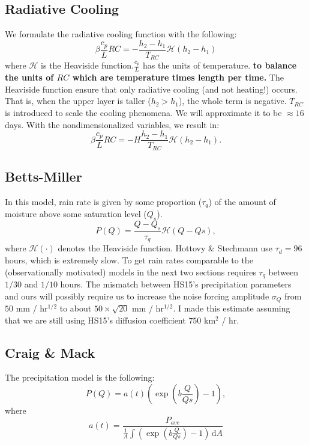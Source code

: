 \documentclass[10pt]{article}
\newcommand{\rmd}{\,\mathrm{d}}
\newcommand{\HH}{\mathcal{H}}
\begin{document}
\subsection{Radiative Cooling}

We formulate the radiative cooling function with the following:
\begin{equation}
\beta \frac{c_p}{L} RC = -\frac{h_2-h_1}{T_{RC}}\HH(h_2-h_1)
\end{equation}
where $\HH$ is the Heaviside function.{\color{blue}$\frac{c_p}{L}$ has the units of temperature.} {\bf to balance the units of $RC$ which are temperature times length per time.} The Heaviside function ensure that only radiative cooling (and not heating!) occurs. 
That is, when the upper layer  is taller ($h_2 > h_1$), the whole term is negative. 
$T_{RC}$ is introduced to scale the cooling phenomena. 
We will approximate it to be $\approx 16$ days. 
{\color{blue} With the nondimensionalized variables, we result in:
	\begin{equation}
	\beta \frac{c_p}{L} RC = -H\frac{h_2-h_1}{T_{RC}}\HH(h_2-h_1).
	\end{equation}
}

\subsection{Betts-Miller}
In this model, rain rate is given by some proportion ($\tau_q$) of the amount of moisture above some saturation level ($Q_s$).
\begin{equation*}
P(Q) = \frac{Q-Q_s}{\tau_q}\HH{(Q-Qs)},
\end{equation*}
where $\HH(\cdot)$ denotes the Heaviside function. 
Hottovy \& Stechmann use $\tau_d=96$ hours, which is extremely slow.
To get rain rates comparable to the (observationally motivated) models in the next two sections requires $\tau_q$ between $1/30$ and $1/10$ hours.
The mismatch between HS15's precipitation parameters and ours will possibly require us to increase the noise forcing amplitude $\sigma_Q$ from $50$ mm / hr$^{1/2}$ to about $50\times\sqrt{20}$ mm / hr$^{1/2}$.
I made this estimate assuming that we are still using HS15's diffusion coefficient $750$ km$^2$ / hr.


\subsection{Craig \& Mack \citep{CM2013}}
The precipitation model is the following:
\begin{equation}
P(Q) = a(t)\left(\exp(b\frac{Q}{Qs})-1\right),
\end{equation}
where 
\begin{equation}
a(t) = \frac{P_{ave}}{\frac{1}{A}\int \left( \exp(b\frac{Q}{Qs})-1 \right)\rmd A}
\end{equation}
\end{document}
